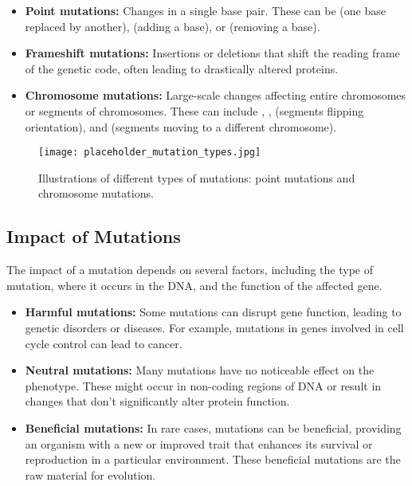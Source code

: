 \begin{itemize}
    \item \textbf{Point mutations:} Changes in a single base pair. These can be  (one base replaced by another),  (adding a base), or  (removing a base).
    \item \textbf{Frameshift mutations:} Insertions or deletions that shift the reading frame of the genetic code, often leading to drastically altered proteins.
    \item \textbf{Chromosome mutations:}  Large-scale changes affecting entire chromosomes or segments of chromosomes. These can include , ,  (segments flipping orientation), and  (segments moving to a different chromosome).
\end{itemize}

\begin{marginnote}
\end{marginnote}

\begin{figure}[htbp]
\centering
\texttt{[image: placeholder\_mutation\_types.jpg]}
\caption{Illustrations of different types of mutations: point mutations and chromosome mutations.}
\end{figure}


\subsection{Impact of Mutations}

The impact of a mutation depends on several factors, including the type of mutation, where it occurs in the DNA, and the function of the affected gene.

\begin{itemize}
    \item \textbf{Harmful mutations:} Some mutations can disrupt gene function, leading to genetic disorders or diseases. For example, mutations in genes involved in cell cycle control can lead to cancer.
    \item \textbf{Neutral mutations:} Many mutations have no noticeable effect on the phenotype. These might occur in non-coding regions of DNA or result in changes that don't significantly alter protein function.
    \item \textbf{Beneficial mutations:} In rare cases, mutations can be beneficial, providing an organism with a new or improved trait that enhances its survival or reproduction in a particular environment. These beneficial mutations are the raw material for evolution.
\end{itemize}

